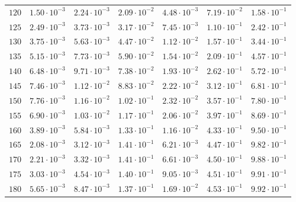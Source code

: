 \begin{table}[h]
\begin{tabular}{lcccccc}
$	120	$ & $	1.50 \cdot 10^{-3}	$ & $	2.24 \cdot 10^{-3}	$ & $	2.09 \cdot 10^{-2}	$ & $	4.48 \cdot 10^{-3}	$ & $	7.19 \cdot 10^{-2}	$ & $	1.58 \cdot 10^{-1}	$ \\
$	125	$ & $	2.49 \cdot 10^{-3}	$ & $	3.73 \cdot 10^{-3}	$ & $	3.17 \cdot 10^{-2}	$ & $	7.45 \cdot 10^{-3}	$ & $	1.10 \cdot 10^{-1}	$ & $	2.42 \cdot 10^{-1}	$ \\
$	130	$ & $	3.75 \cdot 10^{-3}	$ & $	5.63 \cdot 10^{-3}	$ & $	4.47 \cdot 10^{-2}	$ & $	1.12 \cdot 10^{-2}	$ & $	1.57 \cdot 10^{-1}	$ & $	3.44 \cdot 10^{-1}	$ \\
$	135	$ & $	5.15 \cdot 10^{-3}	$ & $	7.73 \cdot 10^{-3}	$ & $	5.90 \cdot 10^{-2}	$ & $	1.54 \cdot 10^{-2}	$ & $	2.09 \cdot 10^{-1}	$ & $	4.57 \cdot 10^{-1}	$ \\
$	140	$ & $	6.48 \cdot 10^{-3}	$ & $	9.71 \cdot 10^{-3}	$ & $	7.38 \cdot 10^{-2}	$ & $	1.93 \cdot 10^{-2}	$ & $	2.62 \cdot 10^{-1}	$ & $	5.72 \cdot 10^{-1}	$ \\
$	145	$ & $	7.46 \cdot 10^{-3}	$ & $	1.12 \cdot 10^{-2}	$ & $	8.83 \cdot 10^{-2}	$ & $	2.22 \cdot 10^{-2}	$ & $	3.12 \cdot 10^{-1}	$ & $	6.81 \cdot 10^{-1}	$ \\
$	150	$ & $	7.76 \cdot 10^{-3}	$ & $	1.16 \cdot 10^{-2}	$ & $	1.02 \cdot 10^{-1}	$ & $	2.32 \cdot 10^{-2}	$ & $	3.57 \cdot 10^{-1}	$ & $	7.80 \cdot 10^{-1}	$ \\
$	155	$ & $	6.90 \cdot 10^{-3}	$ & $	1.03 \cdot 10^{-2}	$ & $	1.17 \cdot 10^{-1}	$ & $	2.06 \cdot 10^{-2}	$ & $	3.97 \cdot 10^{-1}	$ & $	8.69 \cdot 10^{-1}	$ \\
$	160	$ & $	3.89 \cdot 10^{-3}	$ & $	5.84 \cdot 10^{-3}	$ & $	1.33 \cdot 10^{-1}	$ & $	1.16 \cdot 10^{-2}	$ & $	4.33 \cdot 10^{-1}	$ & $	9.50 \cdot 10^{-1}	$ \\
$	165	$ & $	2.08 \cdot 10^{-3}	$ & $	3.12 \cdot 10^{-3}	$ & $	1.41 \cdot 10^{-1}	$ & $	6.21 \cdot 10^{-3}	$ & $	4.47 \cdot 10^{-1}	$ & $	9.82 \cdot 10^{-1}	$ \\
$	170	$ & $	2.21 \cdot 10^{-3}	$ & $	3.32 \cdot 10^{-3}	$ & $	1.41 \cdot 10^{-1}	$ & $	6.61 \cdot 10^{-3}	$ & $	4.50 \cdot 10^{-1}	$ & $	9.88 \cdot 10^{-1}	$ \\
$	175	$ & $	3.03 \cdot 10^{-3}	$ & $	4.54 \cdot 10^{-3}	$ & $	1.40 \cdot 10^{-1}	$ & $	9.05 \cdot 10^{-3}	$ & $	4.51 \cdot 10^{-1}	$ & $	9.91 \cdot 10^{-1}	$ \\
$	180	$ & $	5.65 \cdot 10^{-3}	$ & $	8.47 \cdot 10^{-3}	$ & $	1.37 \cdot 10^{-1}	$ & $	1.69 \cdot 10^{-2}	$ & $	4.53 \cdot 10^{-1}	$ & $	9.92 \cdot 10^{-1}	$ \\

\end{tabular}
\end{table}

